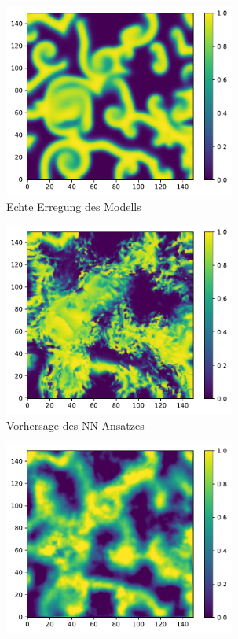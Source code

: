 \begin{figure}[h]
	\centering
	\begin{subfigure}{.5\textwidth}
		\centering
		\includegraphics[height=2.5in]{figures/results/unblur/esn_barkley_u_blur_orig.pdf}
		\setcapmargin[1cm]{0.5cm}
		\caption{Echte Erregung des Modells}
		\label{fig:exp_unblur_barkley_result_orig}
	\end{subfigure}%
	\begin{subfigure}{.5\textwidth}
		\centering
		\includegraphics[height=2.5in]{figures/results/unblur/nn_barkley_u_blur_pred.pdf}
		\setcapmargin[1cm]{0.5cm}
  		\caption{Vorhersage des \textsc{NN}-Ansatzes}
  		\label{fig:exp_unblur_barkley_result_nn_pred}
	\end{subfigure}
	\begin{subfigure}{.5\textwidth}
		\centering
		\includegraphics[height=2.5in]{figures/results/unblur/rbf_barkley_u_blur_pred.pdf}

\end{subfigure}
\end{figure}
